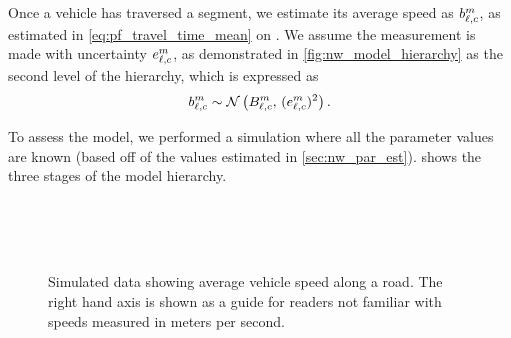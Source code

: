 Once a vehicle has traversed a segment, we estimate its average speed as $b_{\ell,c}^m$, as estimated in \cref{eq:pf_travel_time_mean} on . We assume the measurement is made with uncertainty $e_{\ell,c}^m$, as demonstrated in \cref{fig:nw_model_hierarchy} as the second level of the hierarchy, which is expressed as
\begin{equation}\label{eq:nw_tt_obs_dist}
b_{\ell,c}^m \sim \mathcal{N}\left(B_{\ell,c}^m,\, (e_{\ell,c}^m)^2\right).
\end{equation}



To assess the model, we performed a simulation where all the parameter values are known (based off of the values estimated in \cref{sec:nw_par_est}).  shows the three stages of the model hierarchy.


\begin{knitrout}\small
{}\color{fgcolor}\begin{figure}

{\centering {}\\
\\
\\

}

\caption[Simulated data showing average vehicle speed along a road]{Simulated data showing average vehicle speed along a road. The right hand axis is shown as a guide for readers not familiar with speeds measured in meters per second.}\label{fig:nw_sim_data}
\end{figure}


\end{knitrout}


